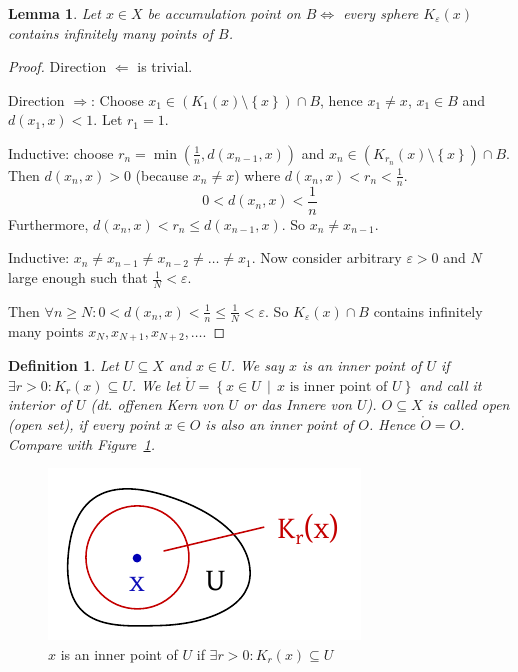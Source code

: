 \documentclass{article}
\newtheorem{definition}{Definition}  \numberwithin{definition}{section}
\newtheorem{lemma}{Lemma}  \numberwithin{lemma}{section}
\newcommand{\set}[1]{\left\{#1\right\}}
\newcommand{\setdef}[2]{\left\{\left.#1\,\middle|\,#2\right.\right\}}
\begin{document}
\begin{lemma}
  Let $x \in X$ be accumulation point on $B \iff$ every sphere $K_{\varepsilon}(x)$ contains infinitely many points of $B$.
\end{lemma}
\begin{proof}
  Direction $\Leftarrow$ is trivial.

  Direction $\Rightarrow$:
  Choose $x_1 \in (K_1(x) \setminus \set{x}) \cap B$, hence $x_1 \neq x$, $x_1 \in B$ and $d(x_1, x) < 1$.
  Let $r_1 = 1$.

  Inductive: choose $r_n = \min(\frac1n, d(x_{n-1}, x))$ and $x_n \in (K_{r_n}(x) \setminus \set{x}) \cap B$.
  Then $d(x_n, x) > 0$ (because $x_n \neq x$) where $d(x_n, x) < r_n < \frac1n$.
  \[ 0 < d(x_n, x) < \frac1n \]
  Furthermore, $d(x_n, x) < r_n \leq d(x_{n-1}, x)$.
  So $x_n \neq x_{n-1}$.

  Inductive: $x_n \neq x_{n-1} \neq x_{n-2} \neq \dots \neq x_1$.
  Now consider arbitrary $\varepsilon > 0$ and $N$ large enough such that $\frac1N < \varepsilon$.

  Then $\forall n \geq N: 0 < d(x_n, x) < \frac1n \leq \frac1N < \varepsilon$.
  So $K_{\varepsilon}(x) \cap B$ contains infinitely many points $x_N, x_{N+1}, x_{N+2}, \dots$.
\end{proof}

\begin{definition} %
  Let $U \subseteq X$ and $x \in U$.
  We say $x$ is an \emph{inner point of $U$} if $\exists r > 0: K_r(x) \subseteq U$.
  We let $\mathring{U} = \setdef{x \in U}{x \text{ is inner point of } U}$ and call it \emph{interior of $U$} (dt. \foreignlanguage{german}{offenen Kern von $U$} or \foreignlanguage{german}{das Innere von $U$}).
  $O \subseteq X$ is called \emph{open} (open set), if every point $x \in O$ is also an inner point of $O$.
  Hence $\mathring{O} = O$. Compare with Figure~\ref{img:inner}.
\end{definition}

\begin{figure}[t]
  \begin{center}
    \includegraphics{img/04_inner_point.pdf}
    \caption{$x$ is an inner point of $U$ if $\exists r > 0: K_r(x) \subseteq U$}
    \label{img:inner}
  \end{center}
\end{figure}
\end{document}
